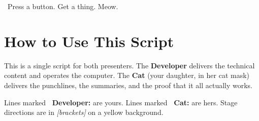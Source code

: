 \documentclass[12pt, letterpaper]{article}
\newcommand{\dev}{\textbf{\color{cogblue}\faIcon{laptop-code}\ Developer:}}
\newcommand{\cat}{\textbf{\color{catpink}\faIcon{cat}\ Cat:}}
\begin{document}
  \begin{titlepage}
    \centering
    \vspace*{2cm}


    \vfill

    {\large\color{black!50} \ Press a button. Get a thing. Meow.}

    \vspace{2cm}
  \end{titlepage}

  \tableofcontents
  \newpage

  \section*{How to Use This Script}

  This is a single script for both presenters. The \textbf{Developer} delivers the
  technical content and operates the computer. The \textbf{Cat} (your daughter, in
  her cat mask) delivers the punchlines, the summaries, and the proof that it all
  actually works.

  Lines marked \dev{} are yours. Lines marked \cat{} are hers.
  Stage directions are in \textit{[brackets]} on a yellow background.
\end{document}
